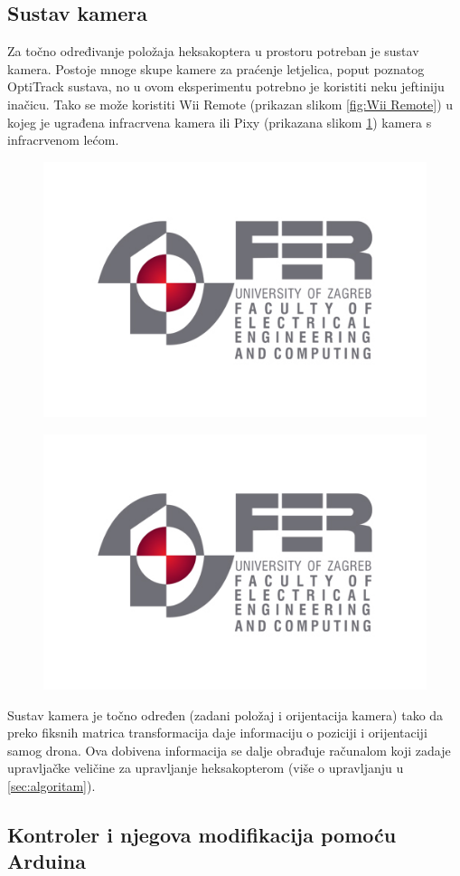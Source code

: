 \documentclass[times, utf8, diplomski]{fer}
\begin{document}
\subsection{Sustav kamera}\label{sec:kamera}
Za točno određivanje položaja heksakoptera u prostoru potreban je sustav kamera. Postoje mnoge skupe kamere za praćenje letjelica, poput poznatog OptiTrack sustava, no u ovom eksperimentu potrebno je koristiti neku jeftiniju inačicu. Tako se može koristiti Wii Remote (prikazan slikom \ref{fig:Wii Remote}) u kojeg je ugrađena infracrvena kamera ili Pixy (prikazana slikom \ref{fig:Pixy kamera}) kamera s infracrvenom lećom. 
\begin{figure}[htb]
\centering
\begin{minipage}{.5\textwidth}
  \centering
  \includegraphics[width=.4\linewidth]{img/fer_logo.jpg}
  \label{fig:Wii Remote}
\end{minipage}%
\begin{minipage}{.5\textwidth}
  \centering
  \includegraphics[width=.4\linewidth]{img/fer_logo.jpg}
  \label{fig:Pixy kamera}
\end{minipage}
\end{figure}
Sustav kamera je točno određen (zadani položaj i orijentacija kamera) tako da preko fiksnih matrica transformacija daje informaciju o poziciji i orijentaciji samog drona. Ova dobivena informacija se dalje obrađuje računalom koji zadaje upravljačke veličine za upravljanje heksakopterom (više o upravljanju u \ref{sec:algoritam}).

\subsection{Kontroler i njegova modifikacija pomoću Arduina}\label{sec:kontroler}
\end{document}

